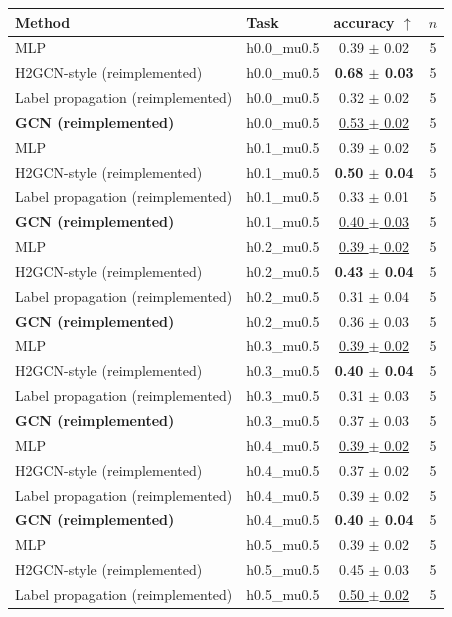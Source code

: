 \begin{tabular}{llcc}
\toprule
Method & Task & accuracy $\uparrow$ & $n$ \\
\midrule
MLP & h0.0\_mu0.5 & 0.39 $\pm$ 0.02 & 5 \\
H2GCN-style (reimplemented) & h0.0\_mu0.5 & \textbf{0.68 $\pm$ 0.03} & 5 \\
Label propagation (reimplemented) & h0.0\_mu0.5 & 0.32 $\pm$ 0.02 & 5 \\
\textbf{GCN (reimplemented)} & h0.0\_mu0.5 & \underline{0.53 $\pm$ 0.02} & 5 \\
\midrule
MLP & h0.1\_mu0.5 & 0.39 $\pm$ 0.02 & 5 \\
H2GCN-style (reimplemented) & h0.1\_mu0.5 & \textbf{0.50 $\pm$ 0.04} & 5 \\
Label propagation (reimplemented) & h0.1\_mu0.5 & 0.33 $\pm$ 0.01 & 5 \\
\textbf{GCN (reimplemented)} & h0.1\_mu0.5 & \underline{0.40 $\pm$ 0.03} & 5 \\
\midrule
MLP & h0.2\_mu0.5 & \underline{0.39 $\pm$ 0.02} & 5 \\
H2GCN-style (reimplemented) & h0.2\_mu0.5 & \textbf{0.43 $\pm$ 0.04} & 5 \\
Label propagation (reimplemented) & h0.2\_mu0.5 & 0.31 $\pm$ 0.04 & 5 \\
\textbf{GCN (reimplemented)} & h0.2\_mu0.5 & 0.36 $\pm$ 0.03 & 5 \\
\midrule
MLP & h0.3\_mu0.5 & \underline{0.39 $\pm$ 0.02} & 5 \\
H2GCN-style (reimplemented) & h0.3\_mu0.5 & \textbf{0.40 $\pm$ 0.04} & 5 \\
Label propagation (reimplemented) & h0.3\_mu0.5 & 0.31 $\pm$ 0.03 & 5 \\
\textbf{GCN (reimplemented)} & h0.3\_mu0.5 & 0.37 $\pm$ 0.03 & 5 \\
\midrule
MLP & h0.4\_mu0.5 & \underline{0.39 $\pm$ 0.02} & 5 \\
H2GCN-style (reimplemented) & h0.4\_mu0.5 & 0.37 $\pm$ 0.02 & 5 \\
Label propagation (reimplemented) & h0.4\_mu0.5 & 0.39 $\pm$ 0.02 & 5 \\
\textbf{GCN (reimplemented)} & h0.4\_mu0.5 & \textbf{0.40 $\pm$ 0.04} & 5 \\
\midrule
MLP & h0.5\_mu0.5 & 0.39 $\pm$ 0.02 & 5 \\
H2GCN-style (reimplemented) & h0.5\_mu0.5 & 0.45 $\pm$ 0.03 & 5 \\
Label propagation (reimplemented) & h0.5\_mu0.5 & \underline{0.50 $\pm$ 0.02} & 5 \\

\end{tabular}
